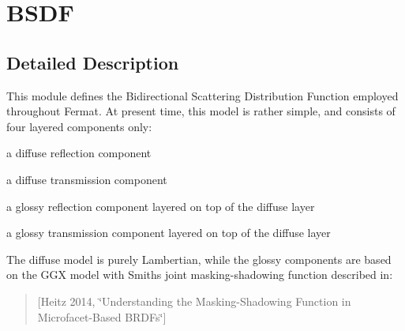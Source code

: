 \hypertarget{group___b_s_d_f_module}{}\section{B\+S\+DF}
\label{group___b_s_d_f_module}


\subsection{Detailed Description}
\begin{DoxyParagraph}{}
This module defines the Bidirectional Scattering Distribution Function employed throughout Fermat. At present time, this model is rather simple, and consists of four layered components only\+: 
\end{DoxyParagraph}
\begin{DoxyParagraph}{}

\begin{DoxyItemize}
\item a diffuse reflection component
\item a diffuse transmission component
\item a glossy reflection component layered on top of the diffuse layer
\item a glossy transmission component layered on top of the diffuse layer 
\end{DoxyItemize}
\end{DoxyParagraph}
\begin{DoxyParagraph}{}
The diffuse model is purely Lambertian, while the glossy components are based on the G\+GX model with Smith\textquotesingle{}s joint masking-\/shadowing function described in\+: \begin{quote}
\mbox{[}Heitz 2014, \char`\"{}\+Understanding the Masking-\/\+Shadowing Function in Microfacet-\/\+Based B\+R\+D\+Fs\char`\"{}\mbox{]}\end{quote}

\end{DoxyParagraph}
